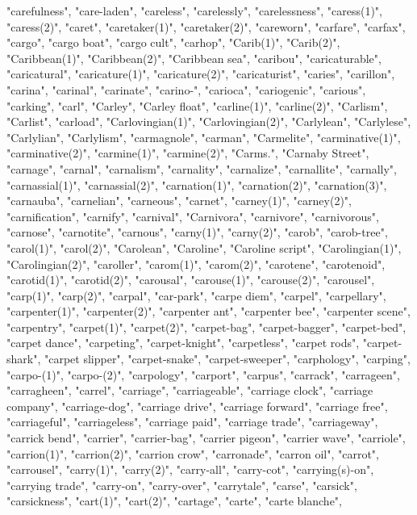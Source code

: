 "carefulness",
"care-laden",
"careless",
"carelessly",
"carelessness",
"caress(1)",
"caress(2)",
"caret",
"caretaker(1)",
"caretaker(2)",
"careworn",
"carfare",
"carfax",
"cargo",
"cargo boat",
"cargo cult",
"carhop",
"Carib(1)",
"Carib(2)",
"Caribbean(1)",
"Caribbean(2)",
"Caribbean sea",
"caribou",
"caricaturable",
"caricatural",
"caricature(1)",
"caricature(2)",
"caricaturist",
"caries",
"carillon",
"carina",
"carinal",
"carinate",
"carino-",
"carioca",
"cariogenic",
"carious",
"carking",
"carl",
"Carley",
"Carley float",
"carline(1)",
"carline(2)",
"Carlism",
"Carlist",
"carload",
"Carlovingian(1)",
"Carlovingian(2)",
"Carlylean",
"Carlylese",
"Carlylian",
"Carlylism",
"carmagnole",
"carman",
"Carmelite",
"carminative(1)",
"carminative(2)",
"carmine(1)",
"carmine(2)",
"Carms.",
"Carnaby Street",
"carnage",
"carnal",
"carnalism",
"carnality",
"carnalize",
"carnallite",
"carnally",
"carnassial(1)",
"carnassial(2)",
"carnation(1)",
"carnation(2)",
"carnation(3)",
"carnauba",
"carnelian",
"carneous",
"carnet",
"carney(1)",
"carney(2)",
"carnification",
"carnify",
"carnival",
"Carnivora",
"carnivore",
"carnivorous",
"carnose",
"carnotite",
"carnous",
"carny(1)",
"carny(2)",
"carob",
"carob-tree",
"carol(1)",
"carol(2)",
"Carolean",
"Caroline",
"Caroline script",
"Carolingian(1)",
"Carolingian(2)",
"caroller",
"carom(1)",
"carom(2)",
"carotene",
"carotenoid",
"carotid(1)",
"carotid(2)",
"carousal",
"carouse(1)",
"carouse(2)",
"carousel",
"carp(1)",
"carp(2)",
"carpal",
"car-park",
"carpe diem",
"carpel",
"carpellary",
"carpenter(1)",
"carpenter(2)",
"carpenter ant",
"carpenter bee",
"carpenter scene",
"carpentry",
"carpet(1)",
"carpet(2)",
"carpet-bag",
"carpet-bagger",
"carpet-bed",
"carpet dance",
"carpeting",
"carpet-knight",
"carpetless",
"carpet rods",
"carpet-shark",
"carpet slipper",
"carpet-snake",
"carpet-sweeper",
"carphology",
"carping",
"carpo-(1)",
"carpo-(2)",
"carpology",
"carport",
"carpus",
"carrack",
"carrageen",
"carragheen",
"carrel",
"carriage",
"carriageable",
"carriage clock",
"carriage company",
"carriage-dog",
"carriage drive",
"carriage forward",
"carriage free",
"carriageful",
"carriageless",
"carriage paid",
"carriage trade",
"carriageway",
"carrick bend",
"carrier",
"carrier-bag",
"carrier pigeon",
"carrier wave",
"carriole",
"carrion(1)",
"carrion(2)",
"carrion crow",
"carronade",
"carron oil",
"carrot",
"carrousel",
"carry(1)",
"carry(2)",
"carry-all",
"carry-cot",
"carrying(s)-on",
"carrying trade",
"carry-on",
"carry-over",
"carrytale",
"carse",
"carsick",
"carsickness",
"cart(1)",
"cart(2)",
"cartage",
"carte",
"carte blanche",
